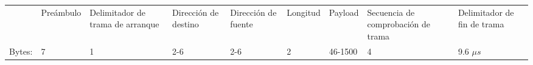 \setlength\extrarowheight{2pt}
\noindent\begin{tabular}{C{0.7cm}|C{1.35cm}|C{1.5cm}|C{1cm}|C{1cm}|C{1cm}|C{1cm}|C{1.8cm}|C{1.5cm}|}
  & Preámbulo & Delimitador de trama de arranque & Dirección de destino & Dirección de fuente & Longitud & Payload & Secuencia de comprobación de trama & Delimitador de fin de trama \\
  Bytes: & 7 & 1 & 2-6 & 2-6 & 2 & 46-1500 & 4 & 9.6 $ \mu s $ \\
\end{tabular}